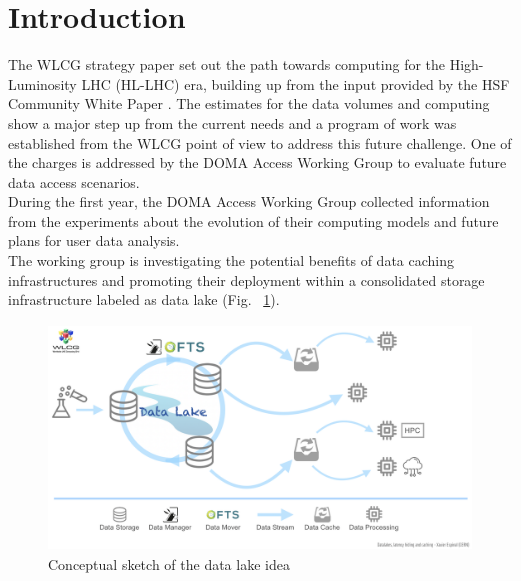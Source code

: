 \section{Introduction}
The WLCG strategy paper \cite{wlcgstrategy} set out the path towards computing for the High-Luminosity LHC (HL-LHC) era, building up from the input provided by the HSF \cite{hsf} Community White Paper \cite{cwp}.
The estimates for the data volumes and computing show a major step up from the current needs and a program of work was established from the WLCG point of view to address this future challenge. One of the charges is addressed by the DOMA Access Working Group to evaluate future data access scenarios.\\
During the first year, the DOMA Access Working Group collected information from the experiments about the evolution of their computing models and future plans for user data analysis.\\
The working group is investigating the potential benefits of data caching infrastructures and promoting their deployment within a consolidated storage infrastructure labeled as data lake (Fig. ~\ref{datalake-sketch-horizontal}).

\begin{figure}
  \centering
  \includegraphics[height=6cm]{Datalake-sketch-horizontal.png}
  \caption{{\em} Conceptual sketch of the data lake idea}
  \label{datalake-sketch-horizontal}
\end{figure}



